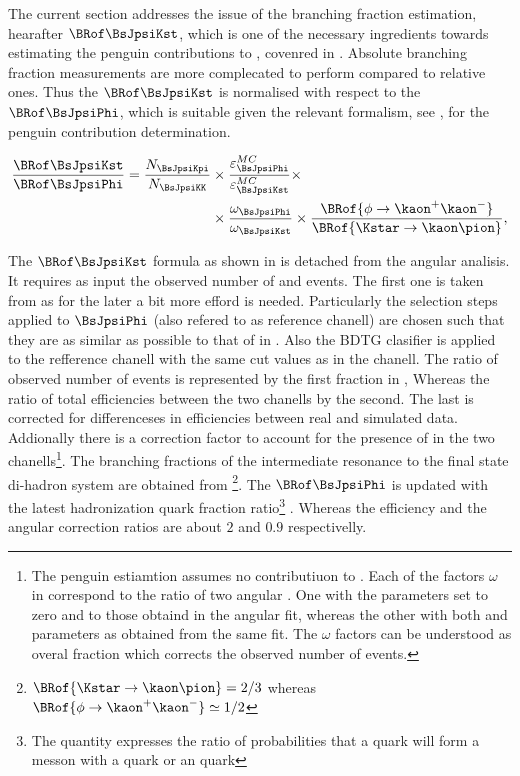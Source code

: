 
The current section addresses the issue of the \BsJpsiKst branching fraction estimation, hearafter $\BRof\BsJpsiKst$,
which is one of the necessary ingredients towards estimating the penguin contributions to \phis, covenred in .
Absolute branching fraction measurements are more complecated to perform compared to relative ones. Thus the $\BRof\BsJpsiKst$
is normalised with respect to the $\BRof\BsJpsiPhi$, which is suitable given the relevant formalism, see ,
for the penguin contribution determination.

\begin{align}
\frac{\BRof\BsJpsiKst}{\BRof\BsJpsiPhi} = \frac{N_{\BsJpsiKpi}}{N_{\BsJpsiKK}} &\times \frac{\varepsilon_{\BsJpsiPhi}^{MC}}{\varepsilon_{\BsJpsiKst}^{MC}} \times \nonumber \\
                                                                          &\times \frac{\omega_{\BsJpsiPhi}}{\omega_{\BsJpsiKst}} \times \frac{\BRof{\phi\to\kaon^+\kaon^-}}{\BRof{\Kstar\to\kaon\pion}},
\label{norm_jpsiPhi}
\end{align}

\noindent The $\BRof\BsJpsiKst$ formula as shown in  is detached from the angular analisis. It requires as input the observed number
of \BsJpsiKst and \BsJpsiPhi events. The first one is taken from  as for the later a bit more efford is needed.
Particularly the selection steps applied to $\BsJpsiPhi$ (also refered to as reference chanell) are chosen such that they are as
similar as possible to that of \BsJpsiKst in . Also the BDTG clasifier is applied to the refference chanell
with the same cut values as in the \BsJpsiKst chanell. The ratio of observed number of events is represented by the first fraction in ,
Whereas the ratio of total efficiencies between the two chanells by the second. The last is corrected for differenceses in efficiencies between real and
simulated data. Addionally there is a correction factor to account for the presence of \swave in the two
chanells\footnote{The penguin estiamtion assumes no \swave contributiuon to \BsJpsiKst. Each of the factors $\omega$ in  correspond
to the ratio of two angular \pdfs. One with the \swave parameters set to zero and \pwave to those obtaind in the angular fit,  whereas the other
with both \pwave and \swave parameters as obtained from the same fit. The $\omega$ factors can be understood as overal \swave fraction which
corrects the observed number of events.
}. The branching fractions of the intermediate resonance to the final state di-hadron system are obtained from \cite{PDG}
\footnote{ $\BRof{\Kstar\to\kaon\pion} = 2/3$ whereas $\BRof{\phi\to\kaon^+\kaon^-}\simeq 1/2$}.
The $\BRof\BsJpsiPhi$ \cite{SheldonKK} is updated with the latest hadronization \bquark quark fraction
ratio\footnote{The quantity \fdfs expresses the ratio of probabilities that a \bquark quark will form a messon with a \dquark quark or an \squark quark}
\cite{LHCb-CONF-2013-011}. Whereas the efficiency and the angular correction ratios are about $2$ and $0.9$ respectivelly.

